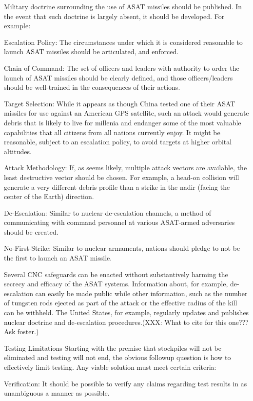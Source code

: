 Military doctrine surrounding the use of ASAT missiles should be published.  In the event that such doctrine is largely absent, it should be developed.  For example:

Escalation Policy: The circumstances under which it is considered reasonable to launch ASAT missiles should be articulated, and enforced.

Chain of Command: The set of officers and leaders with authority to order the launch of ASAT missiles should be clearly defined, and those officers/leaders should be well-trained in the consequences of their actions.

Target Selection: While it appears as though China tested one of their ASAT missiles for use against an American GPS satellite, such an attack would generate debris that is likely to live for millenia and endanger some of the most valuable capabilities that all citizens from all nations currently enjoy.  It might be reasonable, subject to an escalation policy, to avoid targets at higher orbital altitudes.

Attack Methodology: If, as seems likely, multiple attack vectors are available, the least destructive vector should be chosen.  For example, a head-on collision will generate a very different debris profile than a strike in the nadir (facing the center of the Earth) direction.

De-Escalation: Similar to nuclear de-escalation channels, a method of communicating with command personnel at various ASAT-armed adversaries should be created.

No-First-Strike: Similar to nuclear armaments, nations should pledge to not be the first to launch an ASAT missile.

Several CNC safeguards can be enacted without substantively harming the secrecy and efficacy of the ASAT systems.  Information about, for example, de-escalation can easily be made public while other information, such as the number of tungsten rods ejected as part of the attack or the effective radius of the kill can be withheld.  The United States, for example, regularly updates and publishes nuclear doctrine and de-escalation procedures.(XXX: What to cite for this one??? Ask foster.)

Testing Limitations
Starting with the premise that stockpiles will not be eliminated and testing will not end, the obvious followup question is how to effectively limit testing.  Any viable solution must meet certain criteria:

Verification: It should be possible to verify any claims regarding test results in as unambiguous a manner as possible.

